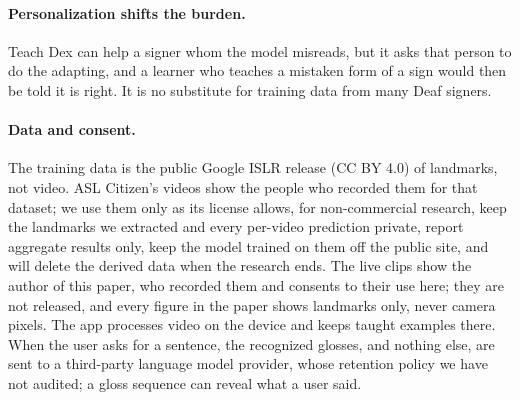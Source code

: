 \paragraph{Personalization shifts the burden.} Teach Dex can help a signer whom the model misreads,
but it asks that person to do the adapting, and a learner who teaches a mistaken form of a sign
would then be told it is right. It is no substitute for training data from many Deaf signers.

\paragraph{Data and consent.} The training data is the public Google ISLR release (CC BY 4.0) of
landmarks, not video. ASL Citizen's videos show the people who recorded them for that dataset; we
use them only as its license allows, for non-commercial research, keep the landmarks we extracted
and every per-video prediction private, report aggregate results only, keep the model trained on
them off the public site, and will delete the derived data when the research ends. The live clips
show the author of this paper, who recorded them and consents to their use here; they are not
released, and every figure in the paper shows landmarks only, never camera pixels. The app
processes video on the device and keeps taught examples there. When the user asks for a sentence,
the recognized glosses, and nothing else, are sent to a third-party language model provider,
whose retention policy we have not audited; a gloss sequence can reveal what a user said.

